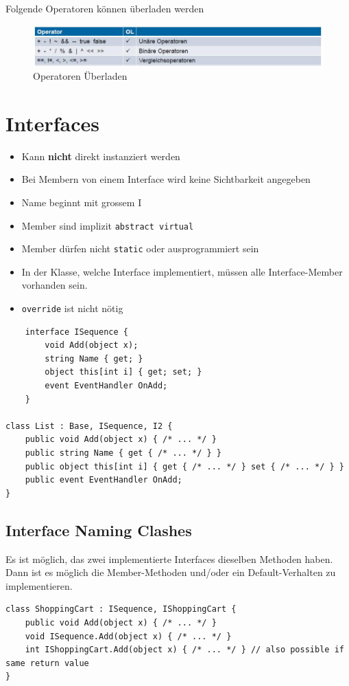 \documentclass[
a4paper,
oneside,
10pt,
fleqn,
headsepline,
toc=listofnumbered, 
bibliography=totocnumbered]{scrartcl}
\let\stdsection\section
\renewcommand\section{\clearpage\stdsection}
\begin{document}
Folgende Operatoren können überladen werden
\begin{figure}[h!]
\centering
\includegraphics[width=0.7\linewidth]{images/operator_overloading}
\caption{Operatoren Überladen}
\label{fig:operatoroverloading}
\end{figure}


\section{Interfaces}
\begin{itemize}
    \item Kann \textbf{nicht} direkt instanziert werden
    \item Bei Membern von einem Interface wird keine Sichtbarkeit angegeben
	\item Name beginnt mit grossem I	
	\item Member sind implizit \lstinline[language=C]|abstract virtual|
	\item Member dürfen nicht \lstinline|static| oder ausprogrammiert sein 
	\item In der Klasse, welche Interface implementiert, müssen alle Interface-Member vorhanden sein. 
	\item \lstinline|override| ist nicht nötig
\end{itemize}
\begin{lstlisting}
	interface ISequence {
		void Add(object x);
		string Name { get; }
		object this[int i] { get; set; }
		event EventHandler OnAdd;
	}
	
class List : Base, ISequence, I2 {
	public void Add(object x) { /* ... */ }
	public string Name { get { /* ... */ } }
    public object this[int i] { get { /* ... */ } set { /* ... */ } }
    public event EventHandler OnAdd;
} 
\end{lstlisting}

\subsection{Interface Naming Clashes}
Es ist möglich, das zwei implementierte Interfaces dieselben Methoden haben. Dann ist es möglich die Member-Methoden und/oder ein Default-Verhalten zu implementieren.

\begin{lstlisting}
class ShoppingCart : ISequence, IShoppingCart {
    public void Add(object x) { /* ... */ } 
    void ISequence.Add(object x) { /* ... */ } 
    int IShoppingCart.Add(object x) { /* ... */ } // also possible if same return value 
}
\end{lstlisting}
\end{document}
